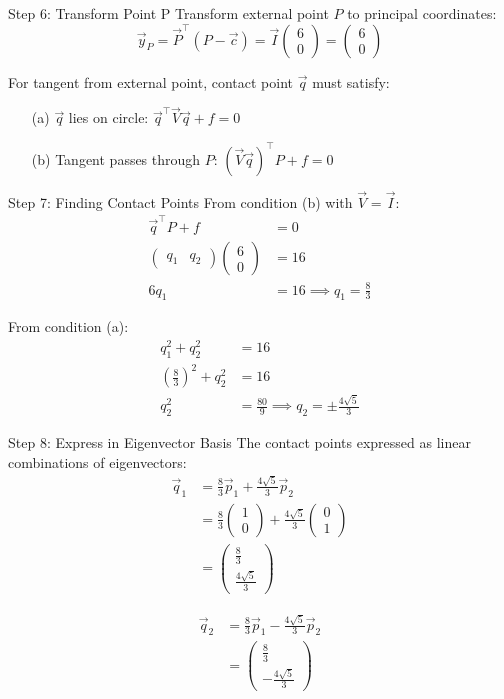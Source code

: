 \documentclass{beamer}
\newcommand{\myvec}[1]{\ensuremath{\begin{pmatrix}#1\end{pmatrix}}}
\providecommand{\brak}[1]{\ensuremath{\left(#1\right)}}
\begin{document}
	\begin{frame}{Step 6: Transform Point P}
		Transform external point $P$ to principal coordinates:
		\begin{equation}
			\vec{y}_P = \vec{P}^\top(P - \vec{c}) = \vec{I}\myvec{6\\0} = \myvec{6\\0}
		\end{equation}
		
		\vspace{1em}
		For tangent from external point, contact point $\vec{q}$ must satisfy:
		\begin{enumerate}
			\item[(a)] $\vec{q}$ lies on circle: $\vec{q}^\top\vec{V}\vec{q} + f = 0$
			\item[(b)] Tangent passes through $P$: $(\vec{V}\vec{q})^\top P + f = 0$
		\end{enumerate}
	\end{frame}
	
	\begin{frame}{Step 7: Finding Contact Points}
		From condition (b) with $\vec{V} = \vec{I}$:
		\begin{align}
			\vec{q}^\top P + f &= 0\\
			\myvec{q_1 & q_2}\myvec{6\\0} &= 16\\
			6q_1 &= 16 \implies q_1 = \frac{8}{3}
		\end{align}
		
		From condition (a):
		\begin{align}
			q_1^2 + q_2^2 &= 16\\
			\brak{\frac{8}{3}}^2 + q_2^2 &= 16\\
			q_2^2 &= \frac{80}{9} \implies q_2 = \pm\frac{4\sqrt{5}}{3}
		\end{align}
	\end{frame}
	
	\begin{frame}{Step 8: Express in Eigenvector Basis}
		The contact points expressed as linear combinations of eigenvectors:
		\begin{align}
			\vec{q}_1 &= \frac{8}{3}\vec{p}_1 + \frac{4\sqrt{5}}{3}\vec{p}_2\\
			&= \frac{8}{3}\myvec{1\\0} + \frac{4\sqrt{5}}{3}\myvec{0\\1}\\
			&= \myvec{\frac{8}{3}\\\frac{4\sqrt{5}}{3}}
		\end{align}
		
		\begin{align}
			\vec{q}_2 &= \frac{8}{3}\vec{p}_1 - \frac{4\sqrt{5}}{3}\vec{p}_2\\
			&= \myvec{\frac{8}{3}\\-\frac{4\sqrt{5}}{3}}
		\end{align}
	\end{frame}
	
\end{document}
